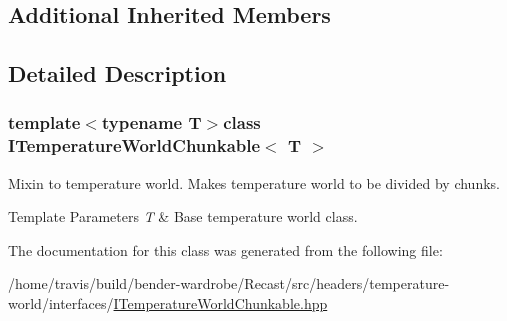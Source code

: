 \subsection*{Additional Inherited Members}


\subsection{Detailed Description}
\subsubsection*{template$<$typename T$>$class I\-Temperature\-World\-Chunkable$<$ T $>$}

Mixin to temperature world. Makes temperature world to be divided by chunks.


\begin{DoxyTemplParams}{Template Parameters}
{\em T} & Base temperature world class. \\
\hline
\end{DoxyTemplParams}


The documentation for this class was generated from the following file\-:\begin{DoxyCompactItemize}
\item 
/home/travis/build/bender-\/wardrobe/\-Recast/src/headers/temperature-\/world/interfaces/\hyperlink{_i_temperature_world_chunkable_8hpp}{I\-Temperature\-World\-Chunkable.\-hpp}\end{DoxyCompactItemize}
